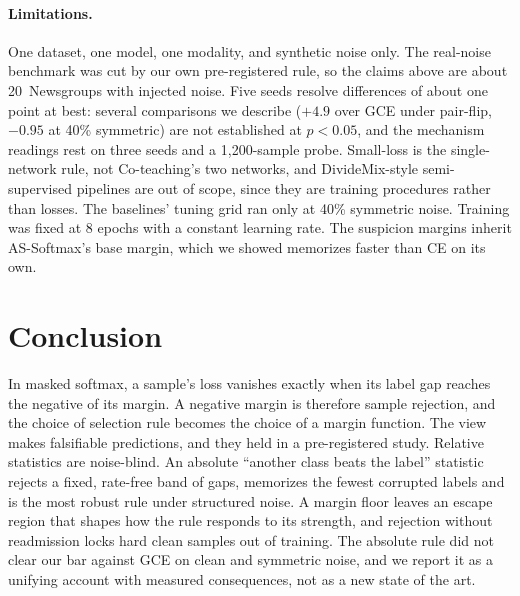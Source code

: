 \paragraph{Limitations.}
One dataset, one model, one modality, and synthetic noise only. The real-noise benchmark was cut
by our own pre-registered rule, so the claims above are about 20~Newsgroups with injected noise.
Five seeds resolve differences of about one point at best: several comparisons we describe
($+4.9$ over GCE under pair-flip, $-0.95$ at 40\% symmetric) are not established at $p < 0.05$,
and the mechanism readings rest on three seeds and a 1{,}200-sample probe.
Small-loss is the single-network rule, not Co-teaching's two networks, and DivideMix-style
semi-supervised pipelines are out of scope, since they are training procedures rather than losses.
The baselines' tuning grid ran only at 40\% symmetric noise. Training was fixed at 8 epochs with a
constant learning rate. The suspicion margins inherit AS-Softmax's base margin, which we showed
memorizes faster than CE on its own.

\section{Conclusion}
\label{sec:conclusion}

In masked softmax, a sample's loss vanishes exactly when its label gap reaches the negative of its
margin. A negative margin is therefore sample rejection, and the choice of selection rule becomes
the choice of a margin function. The view makes falsifiable predictions, and they held in a
pre-registered study. Relative statistics are noise-blind. An absolute ``another class beats the
label'' statistic rejects a fixed, rate-free band of gaps, memorizes the fewest corrupted labels and
is the most robust rule under structured noise. A margin floor leaves an escape region that
shapes how the rule responds to its strength, and rejection without readmission locks hard clean
samples out of training. The absolute rule did not clear our bar against GCE
on clean and symmetric noise, and we report it as a unifying account with measured consequences,
not as a new state of the art.
